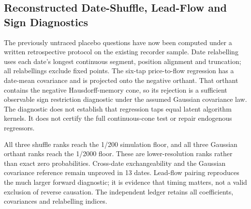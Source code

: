 \subsection{Reconstructed Date-Shuffle, Lead-Flow and Sign Diagnostics}
The previously untraced placebo questions have now been computed under a written retrospective protocol on the existing recorder sample. Date relabelling uses each date's longest continuous segment, position alignment and truncation; all relabellings exclude fixed points. The six-tap price-to-flow regression has a date-mean covariance and is projected onto the negative orthant. That orthant contains the negative Hausdorff-memory cone, so its rejection is a sufficient observable sign restriction diagnostic under the assumed Gaussian covariance law. The diagnostic does not establish that regression taps equal latent algorithm kernels. It does not certify the full continuous-cone test or repair endogenous regressors.
\begin{table}[htbp]
\centering\footnotesize\setlength{\tabcolsep}{3pt}
\caption{Reconstructed recorder diagnostics: 199 fixed-point-free whole-date flow relabellings and 1,999 Gaussian vertex draws for the six-tap negative orthant. The printed ranks are simulation diagnostics at finite resolution, not randomized-treatment or finite-sample market $p$ values.}
\label{tab:falsification}
\end{table}

All three shuffle ranks reach the 1/200 simulation floor, and all three Gaussian orthant ranks reach the 1/2000 floor. These are lower-resolution ranks rather than exact zero probabilities. Cross-date exchangeability and the Gaussian covariance reference remain unproved in 13 dates. Lead-flow pairing reproduces the much larger forward diagnostic; it is evidence that timing matters, not a valid exclusion of reverse causation. The independent ledger retains all coefficients, covariances and relabelling indices.


